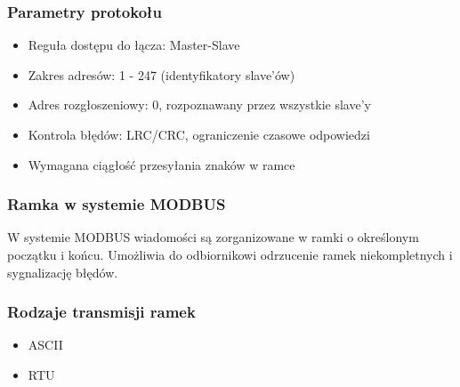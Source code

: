 \documentclass[a4paper,twoside]{article}
\begin{document}
		\subsubsection{Parametry protokołu}
			\begin{itemize}
				\item Reguła dostępu do łącza: Master-Slave
				\item Zakres adresów: 1 - 247 (identyfikatory slave'ów)
				\item Adres rozgłoszeniowy: 0, rozpoznawany przez wszystkie slave'y
				\item Kontrola błędów: LRC/CRC, ograniczenie czasowe odpowiedzi
				\item Wymagana ciągłość przesyłania znaków w ramce
			\end{itemize}
		\subsubsection{Ramka w systemie MODBUS}
			W systemie MODBUS wiadomości są zorganizowane w ramki o określonym początku i końcu. Umożliwia do odbiornikowi odrzucenie ramek niekompletnych i sygnalizację błędów.
		\subsubsection{Rodzaje transmisji ramek}
			\begin{itemize}
				\item ASCII
				\item RTU
			\end{itemize}
\end{document}
